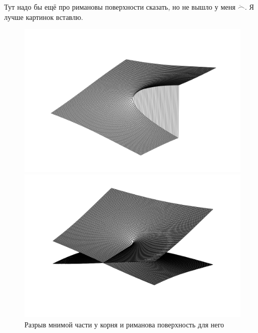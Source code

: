 \documentclass[12pt]{../../notes}
\begin{document}
Тут надо бы ещё про римановы поверхности сказать, но не вышло у меня $\ddot\frown$.
Я лучше картинок вставлю.
\begin{figure}
  \begin{minipage}{0.49\linewidth}
    \includegraphics[width=1\linewidth]{sqrprobl}
  \end{minipage} \hfill
  \begin{minipage}{0.49\linewidth}
    \includegraphics[width=1\linewidth]{sqrootrim}
  \end{minipage}
  \caption{Разрыв мнимой части у корня и риманова поверхность для него}
  \label{fig:sqrtrimsurf}
\end{figure}
\end{document}
